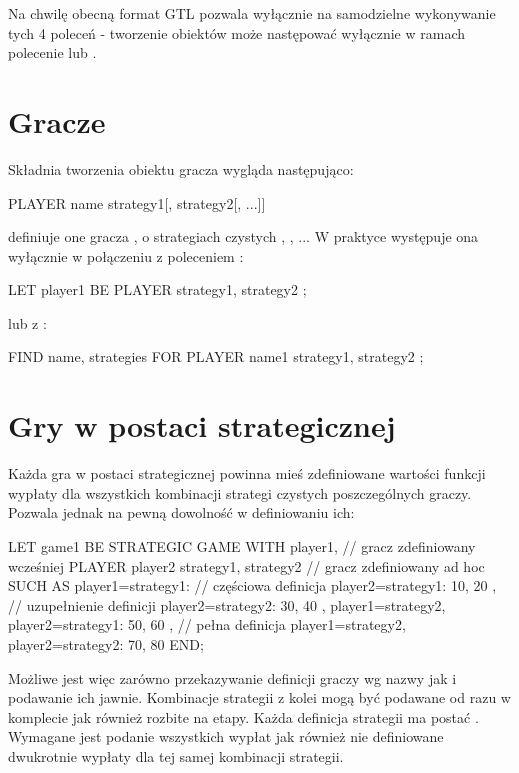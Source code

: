 \documentclass{standalone}
\begin{document}
Na chwilę obecną format GTL pozwala wyłącznie na samodzielne wykonywanie tych 4 poleceń - tworzenie obiektów może następować wyłącznie w ramach
polecenie  lub .

\section{Gracze}

Składnia tworzenia obiektu gracza wygląda następująco:

\begin{code}
PLAYER name { strategy1[, strategy2[, ...]] }
\end{code}

definiuje one gracza , o strategiach czystych , ,
... W praktyce występuje ona wyłącznie w połączeniu z poleceniem :

\begin{code}
LET player1 BE PLAYER { strategy1, strategy2 };
\end{code}

lub z :

\begin{code}
FIND name, strategies FOR PLAYER name1 { strategy1, strategy2 };
\end{code}

\section{Gry w postaci strategicznej}

Każda gra w postaci strategicznej powinna mieś zdefiniowane wartości funkcji wypłaty dla wszystkich kombinacji strategi czystych poszczególnych
graczy. Pozwala jednak na pewną dowolność w definiowaniu ich:

\begin{code}
LET game1 BE
  STRATEGIC GAME
  WITH
    player1, // gracz zdefiniowany wcześniej
  	PLAYER player2 { strategy1, strategy2 } // gracz zdefiniowany ad hoc
  SUCH AS
    { player1=strategy1: // częściowa definicja
  	  { player2=strategy1: 10, 20 }, // uzupełnienie definicji
  	  { player2=strategy2: 30, 40 }
    },
    { player1=strategy2, player2=strategy1: 50, 60 }, // pełna definicja
    { player1=strategy2, player2=strategy2: 70, 80 }
  END;
\end{code}

Możliwe jest więc zarówno przekazywanie definicji graczy wg nazwy jak i podawanie ich jawnie. Kombinacje strategii z kolei mogą być podawane
od razu w komplecie jak również rozbite na etapy. Każda definicja strategii ma postać . Wymagane jest podanie wszystkich wypłat jak również nie definiowane dwukrotnie wypłaty dla tej samej kombinacji strategii.
\end{document}
